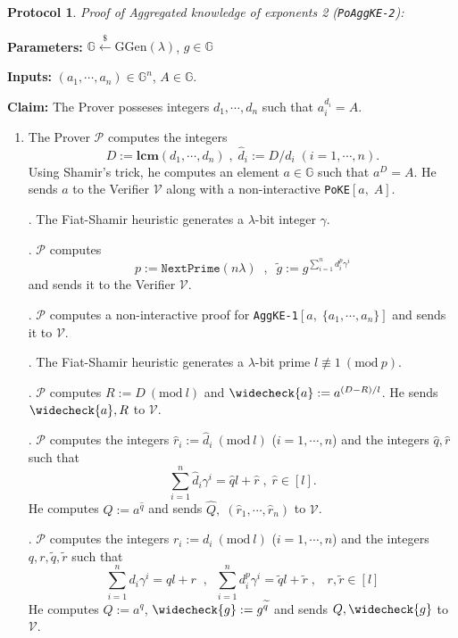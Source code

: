 \documentclass[11pt, lettersize, notitlepage, leqno, footskip=0.6cm]{article}
\newcommand{\slim}{\sum\limits}
\newcommand{\ttt}{\texttt}
\newcommand{\wti}{\widetilde}
\newcommand{\mc}{\mathcal}
\newcommand{\mb}{\mathbb}
\newcommand{\mbf}{\mathbf}
\newcommand{\mr}{\mathrm}
\newcommand{\lam}{\lambda}
\newcommand{\lamb}{\lambda}
\newcommand{\what}{\widehat}
\newcommand{\weck}{\widecheck}
\newcommand{\vs}{\vspace{-0.15cm}}
\newcommand{\noin}{\noindent}
\newcommand{\Mod}[1]{\ (\mathrm{mod}\ #1)}
\newcommand{\LCM}{\mbf{lcm}}
\newtheorem{Prot}[Thm]{Protocol}
\numberwithin{equation}{section}
\begin{document}
\vspace{0.2cm}

\begin{Prot} \normalfont \textit{Proof of Aggregated knowledge of exponents} 2 (\verb|PoAggKE-2|): \end{Prot}\vspace{-0.25cm}

\noindent \textbf{Parameters:} $\mb{G}\xleftarrow{\$} \mr{GGen}(\lamb)$,\; $g\in \mb{G}$ 

\noindent \textbf{Inputs:} $(a_1,\cdots,a_n) \in \mb{G}^n$, $A\in\mb{G}$.

\noindent \textbf{Claim:} The Prover posseses integers $d_1,\cdots,d_n$ such that $a_i^{d_i} = A$.

\begin{enumerate}[wide, labelwidth=!, labelindent=0pt]\vs \item The Prover $\mc{P}$ computes the integers \vs $$D:= \LCM(d_1,\cdots,d_n)\;,\;\what{d}_i:= D/d_i\;(i=1,\cdots,n).$$ Using Shamir's trick, he computes an element $a\in\mb{G}$ such that $a^D = A$. He sends $a$ to the Verifier $\mc{V}$ along with a non-interactive \verb|PoKE|$[a,\;A]$.

\noin 2. The Fiat-Shamir heuristic generates a $\lam$-bit integer $\gamma$.

\noin 3. $\mc{P}$ computes $$p:= \ttt{NextPrime}(n\lam)\;\;,\;\;\wti{g} := g^{\slim_{i=1}^n d_i^{p}\gamma^i}$$ and sends it to the Verifier $\mc{V}$. 

\noin 4. $\mc{P}$ computes a non-interactive proof for \verb|AggKE-1|$[a,\;\{a_1,\cdots,a_n\}]$ and sends it to $\mc{V}$.

\noin 5. The Fiat-Shamir heuristic generates a $\lam$-bit prime $l\not\equiv 1\Mod{p}$.

\noin 6. $\mc{P}$ computes $R:= D\Mod{l}$ and $\weck{a}:= a^{(D-R)/l}$. He sends $\weck{a}, R$ to $\mc{V}$.

\noin 7. $\mc{P}$ computes the integers $\what{r}_i:= \what{d}_i\Mod{l}$ ($i=1,\cdots,n$) and the integers $\what{q},\what{r}$ such that \vs $$\slim_{i=1}^n \what{d}_i\gamma^i = \what{q} l + \what{r}\;,\;\what{r}\in [l].$$ He computes $\what{Q}:= a^{\what{q}}$ and sends $\what{Q},\; (\what{r}_1,\cdots,\what{r}_n)$ to $\mc{V}$.

\noin 8. $\mc{P}$ computes the integers ${r}_i:= {d}_i\Mod{l}$ ($i=1,\cdots,n$) and the integers $q,r,\wti{q},\wti{r}$ such that \vs $$\slim_{i=1}^n d_i\gamma^i = ql+r\;\;,\;\;\slim_{i=1}^n {d}_i^{p}\gamma^i = \wti{q}l+\wti{r}\;,\;\;\;r,\wti{r}\in[l] $$ He computes ${Q}:= a^q$, $\weck{g}:= g^{\wti{q}}$ and sends ${Q}, \weck{g}$ to $\mc{V}$.


\end{enumerate}
\end{document}
